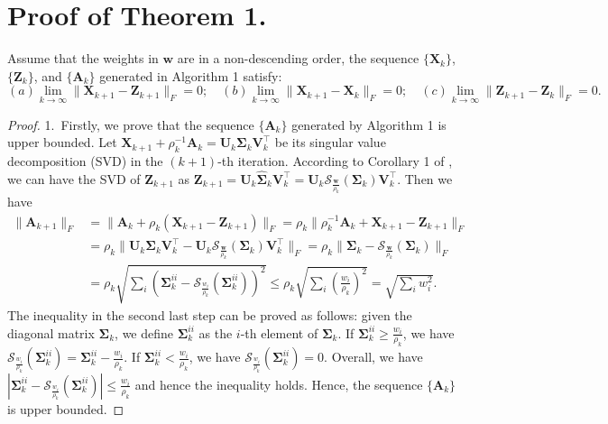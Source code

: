 \section{Proof of Theorem 1.}
\begin{theorem}
Assume that the weights in $\bm{w}$ are in a non-descending order, the sequence $\{\bm{X}_{k}\}$, $\{\bm{Z}_{k}\}$, and $\{\bm{A}_{k}\}$ generated in Algorithm 1 satisfy:
\begin{equation}
(a) \lim_{k \to \infty} \|\bm{X}_{k+1}-\bm{Z}_{k+1}\|_{F}=0;
\quad
(b) \lim_{k \to \infty} \|\bm{X}_{k+1}-\bm{X}_{k}\|_{F}=0;
\quad
(c) \lim_{k \to \infty} \|\bm{Z}_{k+1}-\bm{Z}_{k}\|_{F}=0.
\end{equation}
\end{theorem}
\begin{proof}
1.\ Firstly, we prove that the sequence $\{\bm{A}_{k}\}$ generated by Algorithm 1 is upper bounded.
Let $\bm{X}_{k+1}+\rho_{k}^{-1}\bm{A}_{k}
=
\bm{U}_{k}\bm{\Sigma}_{k}\bm{V}_{k}^{\top}$
be its singular value decomposition (SVD) \cite{eckart1936approximation} in the $(k+1)$-th iteration. According to Corollary 1 of \cite{wnnmijcv}, we can have the SVD of $\bm{Z}_{k+1}$ as $\bm{Z}_{k+1}=\bm{U}_{k}\hat{\bm{\Sigma}}_{k}\bm{V}_{k}^{\top}=\bm{U}_{k}\mathcal{S}_{\frac{\bm{w}}{\rho_{k}}}(\bm{\Sigma}_{k})\bm{V}_{k}^{\top}$. 
Then we have 
\begin{align}
\|
\bm{A}_{k+1}
\|_{F}
&
=
\|
\bm{A}_{k}
+
\rho_{k}
(\bm{X}_{k+1}-\bm{Z}_{k+1})
\|_{F}
=
\rho_{k}\|
\rho_{k}^{-1}
\bm{A}_{k}
+
\bm{X}_{k+1}
-
\bm{Z}_{k+1}
\|_{F}
\\
&
=
\rho_{k}\|
\bm{U}_{k}\bm{\Sigma}_{k}\bm{V}_{k}^{\top}
-
\bm{U}_{k}\mathcal{S}_{\frac{\bm{w}}{\rho_{k}}}(\bm{\Sigma}_{k})\bm{V}_{k}^{\top}
\|_{F}
=
\rho_{k}\|
\bm{\Sigma}_{k}
-
\mathcal{S}_{\frac{\bm{w}}{\rho_{k}}}(\bm{\Sigma}_{k})
\|_{F}
\\
&
=
\rho_{k}
\sqrt{\sum_{i}(\bm{\Sigma}_{k}^{ii}-\mathcal{S}_{\frac{w_{i}}{\rho_{k}}}(\bm{\Sigma}_{k}^{ii}))^{2}}
\le
\rho_{k}
\sqrt{\sum_{i}(\frac{w_{i}}{\rho_{k}})^{2}}
=
\sqrt{\sum_{i}w_{i}^{2}}.
\end{align}
The inequality in the second last step can be proved as follows: given the diagonal matrix $\bm{\Sigma}_{k}$, we define $\bm{\Sigma}_{k}^{ii}$ as the $i$-th element of $\bm{\Sigma}_{k}$. If $\bm{\Sigma}_{k}^{ii}\ge\frac{w_{i}}{\rho_{k}}$, we have $\mathcal{S}_{\frac{w_{i}}{\rho_{k}}}(\bm{\Sigma}_{k}^{ii})=\bm{\Sigma}_{k}^{ii}-\frac{w_{i}}{\rho_{k}}$. If $\bm{\Sigma}_{k}^{ii}<\frac{w_{i}}{\rho_{k}}$, we have $\mathcal{S}_{\frac{w_{i}}{\rho_{k}}}(\bm{\Sigma}_{k}^{ii})=0$. Overall, we have $|\bm{\Sigma}_{k}^{ii}-\mathcal{S}_{\frac{w_{i}}{\rho_{k}}}(\bm{\Sigma}_{k}^{ii})|\le\frac{w_{i}}{\rho_{k}}$ and hence the inequality holds. Hence, the sequence $\{\bm{A}_{k}\}$ is upper bounded.


\end{proof}
